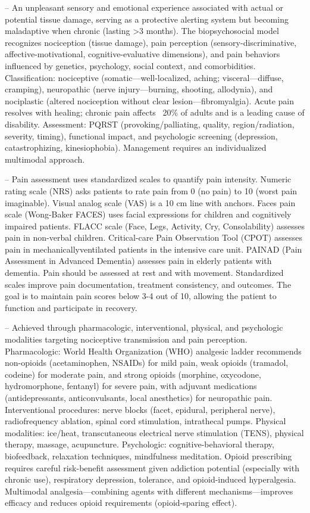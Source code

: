 -- An unpleasant sensory and emotional experience associated with actual or potential tissue damage, serving as a protective alerting system but becoming maladaptive when chronic (lasting >3 months). The biopsychosocial model recognizes nociception (tissue damage), pain perception (sensory-discriminative, affective-motivational, cognitive-evaluative dimensions), and pain behaviors influenced by genetics, psychology, social context, and comorbidities. Classification: nociceptive (somatic—well-localized, aching; visceral—diffuse, cramping), neuropathic (nerve injury—burning, shooting, allodynia), and nociplastic (altered nociception without clear lesion—fibromyalgia). Acute pain resolves with healing; chronic pain affects ~20\% of adults and is a leading cause of disability. Assessment: PQRST (provoking/palliating, quality, region/radiation, severity, timing), functional impact, and psychologic screening (depression, catastrophizing, kinesiophobia). Management requires an individualized multimodal approach.

-- Pain assessment uses standardized scales to quantify pain intensity. Numeric rating scale (NRS) asks patients to rate pain from 0 (no pain) to 10 (worst pain imaginable). Visual analog scale (VAS) is a 10 cm line with anchors. Faces pain scale (Wong-Baker FACES) uses facial expressions for children and cognitively impaired patients. FLACC scale (Face, Legs, Activity, Cry, Consolability) assesses pain in non-verbal children. Critical-care Pain Observation Tool (CPOT) assesses pain in mechanicallyventilated patients in the intensive care unit. PAINAD (Pain Assessment in Advanced Dementia) assesses pain in elderly patients with dementia. Pain should be assessed at rest and with movement. Standardized scales improve pain documentation, treatment consistency, and outcomes. The goal is to maintain pain scores below 3-4 out of 10, allowing the patient to function and participate in recovery.

-- Achieved through pharmacologic, interventional, physical, and psychologic modalities targeting nociceptive transmission and pain perception. Pharmacologic: World Health Organization (WHO) analgesic ladder recommends non-opioids (acetaminophen, NSAIDs) for mild pain, weak opioids (tramadol, codeine) for moderate pain, and strong opioids (morphine, oxycodone, hydromorphone, fentanyl) for severe pain, with adjuvant medications (antidepressants, anticonvulsants, local anesthetics) for neuropathic pain. Interventional procedures: nerve blocks (facet, epidural, peripheral nerve), radiofrequency ablation, spinal cord stimulation, intrathecal pumps. Physical modalities: ice/heat, transcutaneous electrical nerve stimulation (TENS), physical therapy, massage, acupuncture. Psychologic: cognitive-behavioral therapy, biofeedback, relaxation techniques, mindfulness meditation. Opioid prescribing requires careful risk-benefit assessment given addiction potential (especially with chronic use), respiratory depression, tolerance, and opioid-induced hyperalgesia. Multimodal analgesia—combining agents with different mechanisms—improves efficacy and reduces opioid requirements (opioid-sparing effect).

